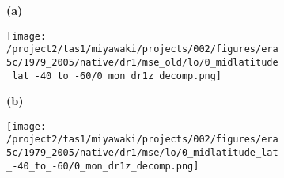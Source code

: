 \documentclass[preview]{standalone}
\begin{document}
\begin{figure}
  \begin{subfigure}[t]{0.05\textwidth}
    \textbf{\normalsize{(a)}}
  \end{subfigure}
  \begin{subfigure}[t]{0.95\textwidth}
    \texttt{[image: /project2/tas1/miyawaki/projects/002/figures/era5c/1979\_2005/native/dr1/mse\_old/lo/0\_midlatitude\_lat\_-40\_to\_-60/0\_mon\_dr1z\_decomp.png]}
  \end{subfigure}
  
  \begin{subfigure}[t]{0.05\textwidth}
    \textbf{\normalsize{(b)}}
  \end{subfigure}
  \begin{subfigure}[t]{0.95\textwidth}
    \texttt{[image: /project2/tas1/miyawaki/projects/002/figures/era5c/1979\_2005/native/dr1/mse/lo/0\_midlatitude\_lat\_-40\_to\_-60/0\_mon\_dr1z\_decomp.png]}
  \end{subfigure}
\end{figure}
\end{document}
